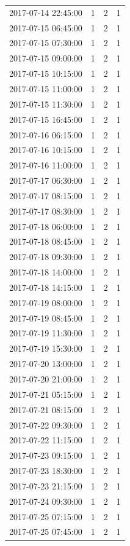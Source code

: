 \begin{tabular}{lrrr}
2017-07-14 22:45:00 & 1 & 2 & 1 \\
2017-07-15 06:45:00 & 1 & 2 & 1 \\
2017-07-15 07:30:00 & 1 & 2 & 1 \\
2017-07-15 09:00:00 & 1 & 2 & 1 \\
2017-07-15 10:15:00 & 1 & 2 & 1 \\
2017-07-15 11:00:00 & 1 & 2 & 1 \\
2017-07-15 11:30:00 & 1 & 2 & 1 \\
2017-07-15 16:45:00 & 1 & 2 & 1 \\
2017-07-16 06:15:00 & 1 & 2 & 1 \\
2017-07-16 10:15:00 & 1 & 2 & 1 \\
2017-07-16 11:00:00 & 1 & 2 & 1 \\
2017-07-17 06:30:00 & 1 & 2 & 1 \\
2017-07-17 08:15:00 & 1 & 2 & 1 \\
2017-07-17 08:30:00 & 1 & 2 & 1 \\
2017-07-18 06:00:00 & 1 & 2 & 1 \\
2017-07-18 08:45:00 & 1 & 2 & 1 \\
2017-07-18 09:30:00 & 1 & 2 & 1 \\
2017-07-18 14:00:00 & 1 & 2 & 1 \\
2017-07-18 14:15:00 & 1 & 2 & 1 \\
2017-07-19 08:00:00 & 1 & 2 & 1 \\
2017-07-19 08:45:00 & 1 & 2 & 1 \\
2017-07-19 11:30:00 & 1 & 2 & 1 \\
2017-07-19 15:30:00 & 1 & 2 & 1 \\
2017-07-20 13:00:00 & 1 & 2 & 1 \\
2017-07-20 21:00:00 & 1 & 2 & 1 \\
2017-07-21 05:15:00 & 1 & 2 & 1 \\
2017-07-21 08:15:00 & 1 & 2 & 1 \\
2017-07-22 09:30:00 & 1 & 2 & 1 \\
2017-07-22 11:15:00 & 1 & 2 & 1 \\
2017-07-23 09:15:00 & 1 & 2 & 1 \\
2017-07-23 18:30:00 & 1 & 2 & 1 \\
2017-07-23 21:15:00 & 1 & 2 & 1 \\
2017-07-24 09:30:00 & 1 & 2 & 1 \\
2017-07-25 07:15:00 & 1 & 2 & 1 \\
2017-07-25 07:45:00 & 1 & 2 & 1 \\

\end{tabular}
